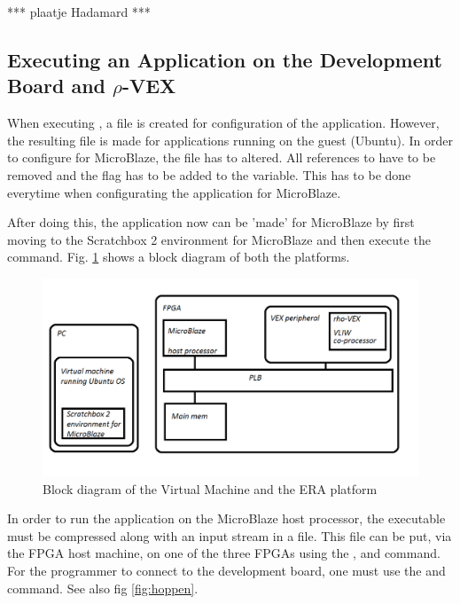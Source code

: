 *** plaatje Hadamard ***

\subsection{Executing an Application on the Development Board and $\rho$-VEX}

When executing , a file is created for configuration of the application. However, the resulting  file is made for applications running on the guest (Ubuntu). In order to configure for MicroBlaze, the  file has to altered. All references to  have to be removed and the  flag has to be added to the  variable. This has to be done everytime when configurating the application for MicroBlaze.

After doing this, the application now can be 'made' for MicroBlaze by first moving to the Scratchbox 2 environment for MicroBlaze and then execute the  command. Fig. \ref{fig:lelijk} shows a block diagram of both the platforms.

\begin{figure}[htb]%
\includegraphics[width=\columnwidth]{Pictures/Platform_paint}%
\caption{Block diagram of the Virtual Machine and the ERA platform}%
\label{fig:lelijk}%
\end{figure}

In order to run the application on the MicroBlaze host processor, the  executable must be compressed along with an input stream in a  file. This file can be put, via the FPGA host machine, on one of the three FPGAs using the ,  and  command. For the programmer to connect to the development board, one must use the  and  command. See also fig \ref{fig:hoppen}.

